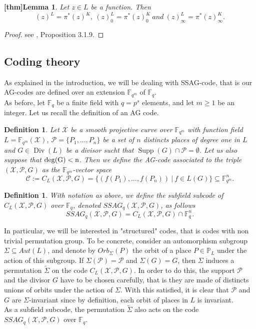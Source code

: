 \documentclass[10pt]{article}
\newtheorem{def1}[thm]{Definition}
\newtheorem{lem1}{[thm]Lemma}
\newcommand{\s}{\vspace{0.3cm}}
\newcommand{\PP}{\mathbb{P}}
\newcommand{\fqm}{\mathbb{F}_{q^m}}
\newcommand{\fq}{\mathbb{F}_q}
\newcommand{\su}{\subseteq}
\newcommand{\X}{\mathcal{X}}
\newcommand{\PR}{\mathcal{P}}
\newcommand{\Div}{\operatorname{Div}}
\newcommand{\Supp}{\operatorname{Supp}}
\begin{document}
\s

\begin{lem1} \label{tiréarr}
Let $z \in L$ be a function. Then 
\[(z)^L = \pi^*(z)^K, \ (z)^L_0 = \pi^*(z)_0^K \ and \ (z)^L_{\infty} = \pi^*(z)^K_{\infty}.\]
\end{lem1} 

\s

\begin{proof}
see \cite{Sti}, Proposition 3.1.9.
\end{proof}

\s

\subsection{Coding theory}

\s

As explained in the introduction, we will be dealing with SSAG-code, that is our AG-codes are defined over an extension $\fqm$ of $\fq$. \\
As before, let $\fq$ be a finite field with $q=p^s$ elements, and let $m \geq 1$ be an integer. Let us recall the definition of an AG code.

\s

\begin{def1}
Let $\X$ be a smooth projective curve over $\fqm$ with function field $L = \fqm(\X)$, $\PR = \{P_1,...,P_n\}$ be a set of $n$ distincts places of degree one in $L$  and $G \in \Div(L)$ be a divisor sucht that $\Supp(G) \cap \PR = \emptyset$. Let us also suppose that $\rm{deg}(G)<n$. Then we define the AG-code associated to the triple $(\X,\PR,G)$ as the $\fqm$-vector space
\[\mathcal{C} := C_L(\X,\PR,G) = \{ (f(P_1),...,f(P_n)) \ | \ f \in L(G)\} \su \fqm^n.\]
\end{def1}

\s

\begin{def1}
With notation as above, we define the subfield subcode of $C_L(\X,\PR,G)$ over $\fq$, denoted $SSAG_q(\X,\PR,G)$, as follows
\[ SSAG_q(\X,\PR,G) = C_L(\X,\PR,G) \cap \fq^n.\]
\end{def1}

\s

In particular, we will be interested in "structured" codes, that is codes with non trivial permutation group. To be concrete, consider an automorphism subgroup $\Sigma \su Aut(L)$, and denote by $Orb_{\Sigma}(P)$ the orbit of a place $P \in \PP_L$ under the action of this subgroup. If $\Sigma(\PR) = \PR$ and $\Sigma(G)=G$, then $\Sigma$ induces a permutation $\tilde{\Sigma}$ on the code $C_L(\X,\PR,G)$. In order to do this, the support $\PR$ and the divisor $G$ have to be chosen carefully, that is they are made of distincts unions of orbits under the action of $\Sigma$. With this satisfied, it is clear that $\PR$ and $G$ are $\Sigma$-invariant since by definition, each orbit of places in $L$ is invariant. \\
As a subfield subcode, the permutation $\tilde{\Sigma}$ also acts on the code $SSAG_q(\X,\PR,G)$ over $\fq$.
\end{document}
